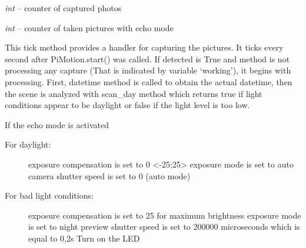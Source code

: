\documentclass[letterpaper,10pt,english,openany]{sphinxmanual}
\begin{document}
\begin{fulllineitems}
\begin{fulllineitems}
\end{fulllineitems}


\begin{fulllineitems}
\label{rpicameramon:rpicameramon.motion.CaptureHandler.i}
\emph{int} -- counter of captured photos

\end{fulllineitems}


\begin{fulllineitems}
\label{rpicameramon:rpicameramon.motion.CaptureHandler.echoCounter}
\emph{int} -- counter of taken pictures with echo mode

\end{fulllineitems}


\begin{fulllineitems}
\label{rpicameramon:rpicameramon.motion.CaptureHandler.motion_detected}
\end{fulllineitems}


\begin{fulllineitems}
\label{rpicameramon:rpicameramon.motion.CaptureHandler.tick}
This tick method provides a handler for capturing the pictures.
It ticks every second after PiMotion.start() was called.
If detected is True and method is not processing any capture
(That is indicated by variable `working'), it begins with processing.
First, datetime method is called to obtain the actual datetime, then
the scene is analyzed with scan\_day method which returns true if
light conditions appear to be daylight or false if the light level
is too low.

If the echo mode is activated
\begin{description}
\item[{For daylight:}] \leavevmode
exposure compensation is set to 0 \textless{}-25;25\textgreater{}
exposure mode is set to auto
camera shutter speed is set to 0 (auto mode)

\item[{For bad light conditions:}] \leavevmode
exposure compensation is set to 25 for maximum brightness
exposure mode is set to night preview
shutter speed is set to 200000 microseconds which is equal
to 0,2s
Turn on the LED


\end{description}
\end{fulllineitems}
\end{fulllineitems}
\end{document}
